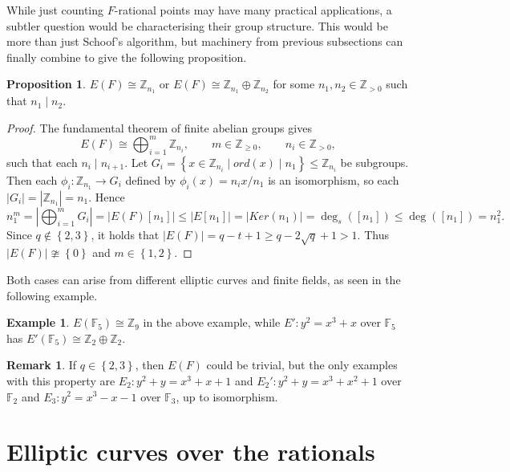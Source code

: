 \documentclass{article}
\newcommand{\F}{\mathbb{F}}
\newcommand{\Z}{\mathbb{Z}}
\newcommand{\rb}[1]{\left( #1 \right)}
\renewcommand{\sb}[1]{\left[ #1 \right]}
\newcommand{\cb}[1]{\left\{ #1 \right\}}
\newcommand{\abs}[1]{\left\lvert #1 \right\rvert}
\theoremstyle{definition}
\newtheorem*{example}{Example}
\newtheorem*{remark}{Remark}
\newtheorem{proposition}{Proposition}[subsection]
\begin{document}
While just counting $ F $-rational points may have many practical applications, a subtler question would be characterising their group structure. This would be more than just Schoof's algorithm, but machinery from previous subsections can finally combine to give the following proposition.

\begin{proposition}
$ E\rb{F} \cong \Z_{n_1} $ or $ E\rb{F} \cong \Z_{n_1} \oplus \Z_{n_2} $ for some $ n_1, n_2 \in \Z_{> 0} $ such that $ n_1 \mid n_2 $.
\end{proposition}

\begin{proof}
The fundamental theorem of finite abelian groups gives
$$ E\rb{F} \cong \bigoplus_{i = 1}^m \Z_{n_i}, \qquad m \in \Z_{\ge 0}, \qquad n_i \in \Z_{> 0}, $$
such that each $ n_i \mid n_{i + 1} $. Let $ G_i = \cb{x \in \Z_{n_i} \mid ord\rb{x} \mid n_1} \le \Z_{n_i} $ be subgroups. Then each $ \phi_i : \Z_{n_1} \to G_i $ defined by $ \phi_i\rb{x} = n_ix / n_1 $ is an isomorphism, so each $ \abs{G_i} = \abs{\Z_{n_1}} = n_1 $. Hence
$$ n_1^m = \abs{\bigoplus_{i = 1}^m G_i} = \abs{E\rb{F}\sb{n_1}} \le \abs{E\sb{n_1}} = \abs{Ker\rb{n_1}} = \deg_s\rb{\sb{n_1}} \le \deg\rb{\sb{n_1}} = n_1^2. $$
Since $ q \notin \cb{2, 3} $, it holds that $ \abs{E\rb{F}} = q - t + 1 \ge q - 2\sqrt{q} + 1 > 1 $. Thus $ \abs{E\rb{F}} \ncong \cb{0} $ and $ m \in \cb{1, 2} $.
\end{proof}

Both cases can arise from different elliptic curves and finite fields, as seen in the following example.

\begin{example}
$ E\rb{\F_5} \cong \Z_9 $ in the above example, while $ E' : y^2 = x^3 + x $ over $ \F_5 $ has $ E'\rb{\F_5} \cong \Z_2 \oplus \Z_2 $.
\end{example}

\begin{remark}
If $ q \in \cb{2, 3} $, then $ E\rb{F} $ could be trivial, but the only examples with this property are $ E_2 : y^2 + y = x^3 + x + 1 $ and $ E_2' : y^2 + y = x^3 + x^2 + 1 $ over $ \F_2 $ and $ E_3 : y^2 = x^3 - x - 1 $ over $ \F_3 $, up to isomorphism.
\end{remark}

\pagebreak

\section{Elliptic curves over the rationals}
\end{document}
